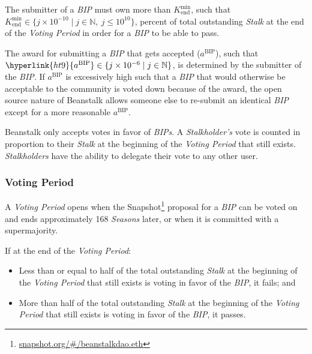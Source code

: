 \documentclass[tikz]{article}
\newcommand{\term}[1]{\textsl{#1}}
\newcommand{\fref}[1]{\footnote{\href{http://#1}{#1}}}
\begin{document}
The submitter of a \term{BIP} must own more than $K_{\text{end}}^{\text{min}}$, such that $K_{\text{end}}^{\text{min}} \in \{j \times 10^{-10} \mid j \in \mathbb{N},\ j \leq 10^{10} \}$, percent of total outstanding \term{Stalk} at the end of the \term{Voting Period} in order for a \term{BIP} to be able to pass.

The award for submitting a \term{BIP} that gets accepted (\hyperlink{ht9}{$a^{\text{BIP}}$}), such that $\hyperlink{ht9}{a^{\text{BIP}}} \in \{j \times 10^{-6} \mid j \in \mathbb{N} \}$, is determined by the submitter of the \term{BIP}. If \hyperlink{ht9}{$a^{\text{BIP}}$} is excessively high such that a \term{BIP} that would otherwise be acceptable to the community is voted down because of the award, the open source nature of Beanstalk allows someone else to re-submit an identical \term{BIP} except for a more reasonable \hyperlink{ht9}{$a^{\text{BIP}}$}.

Beanstalk only accepts votes in favor of \term{BIPs}. A \term{Stalkholder's} vote is counted in proportion to their \term{Stalk} at the beginning of the \term{Voting Period} that still exists. \term{Stalkholders} have the ability to delegate their vote to any other user.

\subsubsection{Voting Period}
\vspace*{-1mm}

A \term{Voting Period} opens when the Snapshot\fref{snapshot.org/\#/beanstalkdao.eth} proposal for a \term{BIP} can be voted on and ends approximately 168 \term{Seasons} later, or when it is committed with a supermajority.

\vspace*{2mm}

If at the end of the \term{Voting Period}:

\begin{itemize}[midsep]
    \item Less than or equal to half of the total outstanding \term{Stalk} at the beginning of the \term{Voting Period} that still exists is voting in favor of the \term{BIP}, it fails; and
    \item More than half of the total outstanding \term{Stalk} at the beginning of the \term{Voting Period} that still exists is voting in favor of the \term{BIP}, it passes.
\end{itemize}
\end{document}

